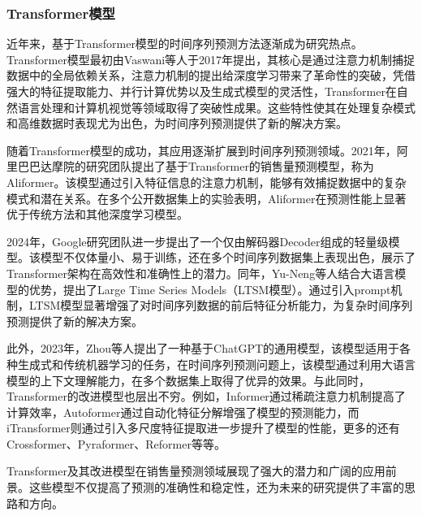 \documentclass[12pt]{article}
\begin{document}
\subsubsection{Transformer模型}
近年来，基于Transformer模型的时间序列预测方法逐渐成为研究热点。Transformer模型最初由Vaswani等人于2017年提出\cite{Attention}，其核心是通过注意力机制捕捉数据中的全局依赖关系，注意力机制的提出给深度学习带来了革命性的突破，凭借强大的特征提取能力、并行计算优势以及生成式模型的灵活性，Transformer在自然语言处理和计算机视觉等领域取得了突破性成果。这些特性使其在处理复杂模式和高维数据时表现尤为出色，为时间序列预测提供了新的解决方案。

随着Transformer模型的成功，其应用逐渐扩展到时间序列预测领域\cite{Transformer综述}。2021年，阿里巴巴达摩院的研究团队提出了基于Transformer的销售量预测模型，称为Aliformer\cite{Alibaba}。该模型通过引入特征信息的注意力机制，能够有效捕捉数据中的复杂模式和潜在关系。在多个公开数据集上的实验表明，Aliformer在预测性能上显著优于传统方法和其他深度学习模型。

2024年，Google研究团队进一步提出了一个仅由解码器Decoder组成的轻量级模型\cite{decoder_only}。该模型不仅体量小、易于训练，还在多个时间序列数据集上表现出色，展示了Transformer架构在高效性和准确性上的潜力。同年，Yu-Neng等人结合大语言模型的优势，提出了Large Time Series Models（LTSM模型）\cite{ltsm}。通过引入prompt机制，LTSM模型显著增强了对时间序列数据的前后特征分析能力，为复杂时间序列预测提供了新的解决方案。

此外，2023年，Zhou等人提出了一种基于ChatGPT的通用模型\cite{onefitsall}，该模型适用于各种生成式和传统机器学习的任务，在时间序列预测问题上，该模型通过利用大语言模型的上下文理解能力，在多个数据集上取得了优异的效果。与此同时，Transformer的改进模型也层出不穷。例如，Informer\cite{informer}通过稀疏注意力机制提高了计算效率，Autoformer\cite{Autoformer}通过自动化特征分解增强了模型的预测能力，而iTransformer\cite{itransformer}则通过引入多尺度特征提取进一步提升了模型的性能，更多的还有Crossformer、Pyraformer、Reformer等等\cite{crossformer}\cite{liu2022pyraformer}\cite{kitaev2020reformer}。

Transformer及其改进模型在销售量预测领域展现了强大的潜力和广阔的应用前景。这些模型不仅提高了预测的准确性和稳定性，还为未来的研究提供了丰富的思路和方向。
\end{document}
